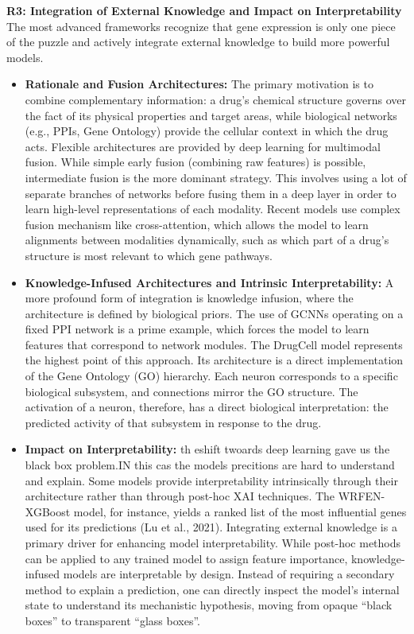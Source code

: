 \documentclass[twocolumn]{article}
\begin{document}
\textbf{R3: Integration of External Knowledge and Impact on Interpretability}
The most advanced frameworks recognize that gene expression is only one piece of the puzzle and actively integrate external knowledge to build more powerful models.
\\
\begin{itemize}
    \item \textbf{Rationale and Fusion Architectures:} The primary motivation is to combine complementary information: a drug's chemical structure governs over the fact of its physical properties and target areas, while biological networks (e.g., PPIs, Gene Ontology) provide the cellular context in which the drug acts\cite{liu2015compound}. Flexible architectures are provided by deep learning for multimodal fusion. While simple early fusion (combining raw features) is possible, intermediate fusion is the more dominant strategy. This involves using a lot of separate branches of networks before fusing them in a deep layer in order to learn high-level representations of each modality\cite{stahlschmidt2022multimodal}. Recent models use complex fusion mechanism like cross-attention, which allows the model to learn alignments between modalities dynamically, such as which part of a drug's structure is most relevant to which gene pathways\cite{elabd2024simple}.
    \item \textbf{Knowledge-Infused Architectures and Intrinsic Interpretability:} A more profound form of integration is knowledge infusion, where the architecture is defined by biological priors. The use of GCNNs operating on a fixed PPI network is a prime example, which forces the model to learn features that correspond to network modules\cite{mcdermott2019deep}. The DrugCell model represents the highest point of this approach\cite{elabd2024simple}.  Its architecture is a direct implementation of the Gene Ontology (GO) hierarchy.  Each neuron corresponds to a specific biological subsystem, and connections mirror the GO structure. The activation of a neuron, therefore, has a direct biological interpretation: the predicted activity of that subsystem in response to the drug\cite{samal2022opportunities}.
    \item \textbf{Impact on Interpretability:} th eshift twoards deep learning gave us the black box problem.IN this cas the models precitions are hard to understand and explain. Some models provide interpretability intrinsically through their architecture rather than through post-hoc XAI techniques. The WRFEN-XGBoost model, for instance, yields a ranked list of the most influential genes used for its predictions (Lu et al., 2021)\cite{lu2021drug}. Integrating external knowledge is a primary driver for enhancing model interpretability. While post-hoc methods can be applied to any trained model to assign feature importance, knowledge-infused models are interpretable by design\cite{samal2022opportunities}. Instead of requiring a secondary method to explain a prediction, one can directly inspect the model's internal state to understand its mechanistic hypothesis, moving from opaque  \enquote{black boxes} to transparent \enquote{glass boxes}.
\end{itemize}
\end{document}
